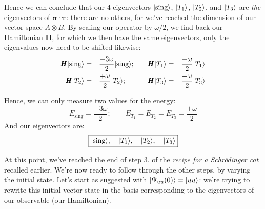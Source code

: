 \documentclass[solutions.tex]{subfiles}
\begin{document}
Hence we can conclude that our $4$ eigenvectors $|\text{sing}\rangle$,
$|T_1\rangle$, $|T_2\rangle$, and $|T_3\rangle$ are \textit{the} eigenvectors
of $\bm{\sigma}\cdot\bm{\tau}$: there are no others, for we've reached
the dimension of our vector space $A\otimes B$. By scaling our operator
by $\omega/2$, we find back our Hamiltonian $\bm{H}$, for which we then have the
same eigenvectors, only the eigenvalues now need to be shifted likewise:
\begin{equation*}\begin{aligned}
	\pmb{H}|\text{sing}\rangle &=&& \frac{-3\omega}2|\text{sing}\rangle; &&&
	\pmb{H}|T_1\rangle &=&& \frac{+\omega}2|T_1\rangle \\
	\pmb{H}|T_2\rangle &=&& \frac{+\omega}2|T_2\rangle; &&&
	\pmb{H}|T_3\rangle &=&& \frac{+\omega}2|T_3\rangle \\
\end{aligned}\end{equation*}

Hence, we can only measure two values for the energy:
\[
	\boxed{E_{\text{sing}} = \frac{-3\omega}2;\qquad
		E_{T_1} = E_{T_2} = E_{T_3} = \frac{+\omega}2
	}
\]
And our eigenvectors are:
\[
	\boxed{
		|\text{sing}\rangle,\quad |T_1\rangle,\quad
		|T_2\rangle,\quad |T_3\rangle
	}
\]

\hr

At this point, we've reached the end of step $3.$ of the
\textit{recipe for a Schr\"odinger cat} recalled earlier. We're
now ready to follow through the other steps, by varying the
initial state. Let's start as suggested with $|\Psi_{uu}(0)\rangle = |uu\rangle$:
we're trying to rewrite this initial vector state in the basis
corresponding to the eigenvectors of our observable (our Hamiltonian). \\
\end{document}
